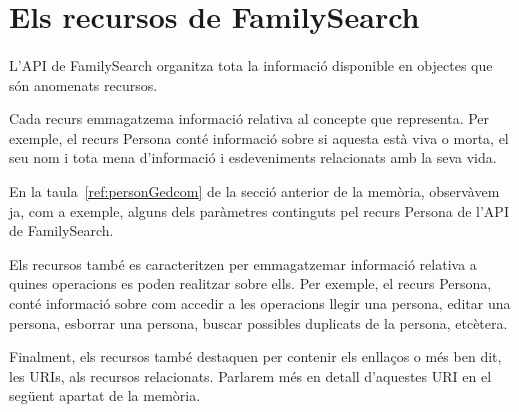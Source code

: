 \section{Els recursos de FamilySearch}

    \paragraph{}
    L'API de FamilySearch organitza tota la informació disponible en objectes que són anomenats recursos.

    Cada recurs emmagatzema informació relativa al concepte que representa. Per exemple, el recurs Persona conté informació sobre si aquesta està viva o morta, el seu nom i tota mena d'informació i esdeveniments relacionats amb la seva vida.

    En la taula~\ref{ref:personGedcom} de la secció anterior de la memòria, observàvem ja, com a exemple, alguns dels paràmetres continguts pel recurs Persona de l'API de FamilySearch.

    Els recursos també es caracteritzen per emmagatzemar informació relativa a quines operacions es poden realitzar sobre ells. Per exemple, el recurs Persona, conté informació sobre com accedir a les operacions llegir una persona, editar una persona, esborrar una persona, buscar possibles duplicats de la persona, etcètera.

    Finalment, els recursos també destaquen per contenir els enllaços o més ben dit, les URIs, als recursos relacionats. Parlarem més en detall d’aquestes URI en el següent apartat de la memòria.
